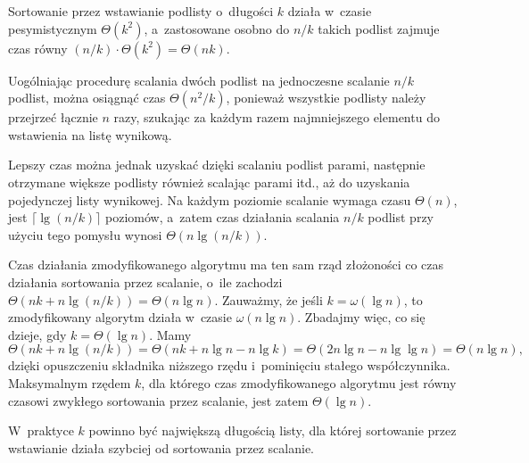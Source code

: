
\subproblem %
Sortowanie przez wstawianie podlisty o~długości $k$ działa w~czasie pesymistycznym $\Theta(k^2)$, a~zastosowane osobno do $n/k$ takich podlist zajmuje czas równy $(n/k)\cdot\Theta(k^2)=\Theta(nk)$.

\subproblem %
Uogólniając procedurę scalania dwóch podlist na jednoczesne scalanie $n/k$ podlist, można osiągnąć czas $\Theta(n^2\!/k)$, ponieważ wszystkie podlisty należy przejrzeć łącznie $n$ razy, szukając za każdym razem najmniejszego elementu do wstawienia na listę wynikową.

Lepszy czas można jednak uzyskać dzięki scalaniu podlist parami, następnie otrzymane większe podlisty również scalając parami itd., aż do uzyskania pojedynczej listy wynikowej.
Na każdym poziomie scalanie wymaga czasu $\Theta(n)$, jest $\lceil\lg(n/k)\rceil$ poziomów, a~zatem czas działania scalania $n/k$ podlist przy użyciu tego pomysłu wynosi $\Theta(n\lg(n/k))$.

\subproblem %
Czas działania zmodyfikowanego algorytmu ma ten sam rząd złożoności co czas działania sortowania przez scalanie, o~ile zachodzi $\Theta(nk+n\lg(n/k))=\Theta(n\lg n)$.
Zauważmy, że jeśli $k=\omega(\lg n)$, to zmodyfikowany algorytm działa w~czasie $\omega(n\lg n)$.
Zbadajmy więc, co się dzieje, gdy $k=\Theta(\lg n)$.
Mamy
\[
	\Theta(nk+n\lg(n/k)) = \Theta(nk+n\lg n-n\lg k) = \Theta(2n\lg n-n\lg\lg n) = \Theta(n\lg n),
\]
dzięki opuszczeniu składnika niższego rzędu i~pominięciu stałego współczynnika.
Maksymalnym rzędem $k$, dla którego czas zmodyfikowanego algorytmu jest równy czasowi zwykłego sortowania przez scalanie, jest zatem $\Theta(\lg n)$.

\subproblem %
W~praktyce $k$ powinno być największą długością listy, dla której sortowanie przez wstawianie działa szybciej od sortowania przez scalanie.
